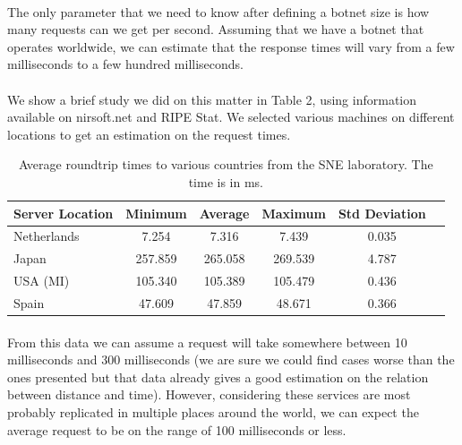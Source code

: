 \documentclass[12pt]{article}
\begin{document}
\paragraph{}
The only parameter that we need to know after defining a botnet size is how many requests can we get per second. Assuming that we have a botnet that operates worldwide, we can estimate that the response times will vary from a few milliseconds to a few hundred milliseconds.

\paragraph{}
We show a brief study we did on this matter in Table 2, using information available on nirsoft.net\cite{nirsoft} and RIPE Stat\cite{ripestat}. We selected various machines on different locations to get an estimation on the request times.

\begin{table}[h]
		\begin{tabular}{|l|c|c|c|c|c|}
  			\hline
	  		\textbf{Server Location} & \textbf{Minimum} & \textbf{Average} & \textbf{Maximum} & \textbf{Std Deviation} \\
	  		\hline
  			Netherlands \cite{ripestatnl} & 7.254 & 7.316 & 7.439 & 0.035  \\ 
  			\hline
  			Japan \cite{ripestatjp} & 257.859 & 265.058 & 269.539 & 4.787 \\
	  		\hline
  			USA (MI)  \cite{ripestatus} & 105.340 & 105.389 & 105.479 & 0.436 \\
  			\hline
  			Spain \cite{ripestates}& 47.609 & 47.859 & 48.671 & 0.366 \\
  			\hline
		\end{tabular}
	\caption[A table]{Average roundtrip times to various countries from the SNE laboratory. The time is in ms.}
\end{table}

\paragraph{}
From this data we can assume a request will take somewhere between 10 milliseconds and 300 milliseconds (we are sure we could find cases worse than the ones presented but that data already gives a good estimation on the relation between distance and time). However, considering these services are most probably replicated in multiple places around the world, we can expect the average request to be on the range of 100 milliseconds or less.
\end{document}
